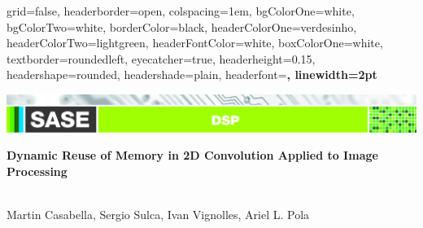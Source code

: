 \documentclass[a1paper,portrait,fontscale=0.43]{baposter}
\begin{document}

\begin{poster}
{
grid=false,
headerborder=open, %
colspacing=1em, %
bgColorOne=white, %
bgColorTwo=white, %
borderColor=black, %
headerColorOne=verdesinho, %
headerColorTwo=lightgreen, %
headerFontColor=white, %
boxColorOne=white, %
textborder=roundedleft, %
eyecatcher=true, %
headerheight=0.15\textheight, %
headershape=rounded, %
headershade=plain,
headerfont=\Large\bf\textsf, %
linewidth=2pt %
}
{}
%
%
{  
  {\includegraphics[trim=1.7cm 0 0 5cm, width=247mm]{DSP-02}\vspace{0.2em}}%


  \huge\bf\textsf %
  {Dynamic Reuse of Memory in 2D Convolution Applied to Image Processing}
} %
{{\sf\vspace{0.5em}\\
    Martin Casabella,
    Sergio Sulca,
    Ivan Vignolles,
    Ariel L. Pola
    \small{

}}}
\end{poster}
\end{document}
